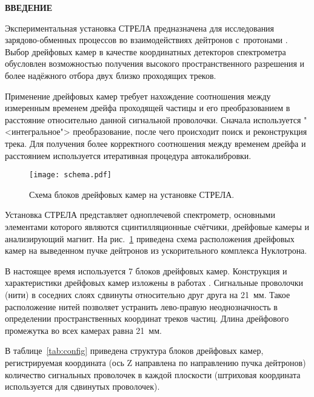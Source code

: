 
\vspace* {2.5cm}
\begin{center} \bf{ВВЕДЕНИЕ} \end{center}

Экспериментальная установка СТРЕЛА предназначена для исследования
зарядово-обменных процессов во взаимодействиях дейтронов с~протонами
\cite{cejp:2008}. Выбор дрейфовых камер в качестве координатных детекторов
спектрометра обусловлен возможностью получения высокого пространственного
разрешения и более надёжного отбора двух близко проходящих треков.

Применение дрейфовых камер требует нахождение соотношения между измеренным
временем дрейфа проходящей частицы и его преобразованием в расстояние
относительно данной сигнальной проволочки. Сначала используется
"<интегральное"> преобразование, после чего происходит поиск и реконструкция
трека. Для получения более корректного соотношения между временем дрейфа
и расстоянием используется итеративная процедура автокалибровки.

\begin{figure}[h]
  \begin{center}
    \texttt{[image: schema.pdf]}
    \caption {Схема блоков дрейфовых камер на установке СТРЕЛА.}
    \label{fig:schema}
  \end{center}
\end{figure}

Установка СТРЕЛА \cite{strela:web} представляет одноплечевой спектрометр,
основными элементами которого являются сцинтилляционные счётчики, дрейфовые
камеры и анализирующий магнит. На рис.~\ref{fig:schema} приведена схема
расположения дрейфовых камер на выведенном пучке дейтронов из ускорительного
комплекса Нуклотрона.

В настоящее время используется 7 блоков дрейфовых камер. Конструкция и
характеристики дрейфовых камер изложены в работах \cite{filatova:1977,
  vodopianov:1975, vodopianov:1983}. Сигнальные проволочки (нити) в соседних
слоях сдвинуты относительно друг друга на 21~мм. Такое расположение нитей
позволяет устранить лево-правую неоднозначность в определении пространственных
координат треков частиц. Длина дрейфового промежутка во всех камерах равна
21~мм.

В таблице~\ref{tab:config} приведена структура блоков дрейфовых камер,
регистрируемая координата (ось Z направлена по направлению пучка дейтронов)
количество сигнальных проволочек в каждой плоскости (штриховая координата
используется для сдвинутых проволочек).

